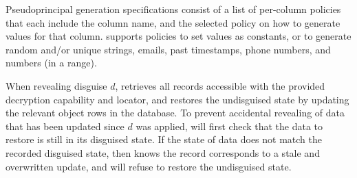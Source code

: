 Pseudoprincipal generation specifications consist of a list of per-column policies that each
include the column name, and the selected policy on how to generate values for that column.
\sys supports policies to set values as constants, or to generate random and/or unique strings, emails, past timestamps, phone
numbers, and numbers (in a range).

When revealing disguise $d$, \sys retrieves all records accessible with the provided decryption capability
and locator, and restores the undisguised state by updating the relevant object rows in the database.
To prevent accidental revealing of data that has been updated since $d$ was applied,
\sys will first check that the data to restore is still in its disguised state. If the state of data does
not match the recorded disguised state, then \sys knows the record corresponds to a stale and
overwritten update, and will refuse to restore the undisguised state.



